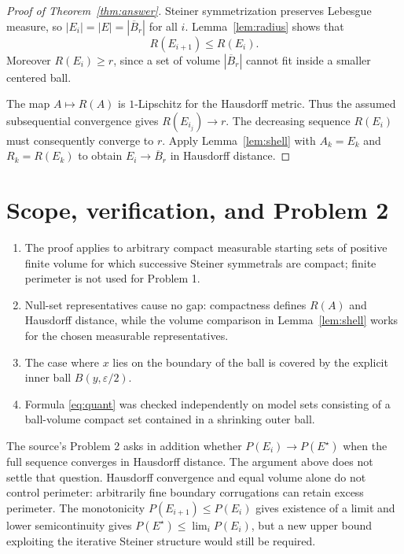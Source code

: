 \documentclass[11pt]{article}
\begin{document}
\begin{proof}[Proof of Theorem~\ref{thm:answer}]
Steiner symmetrization preserves Lebesgue measure, so
$|E_i|=|E|=|\overline B_r|$ for all $i$. Lemma~\ref{lem:radius} shows that
\[
 R(E_{i+1})\leq R(E_i).
\]
Moreover $R(E_i)\geq r$, since a set of volume $|\overline B_r|$ cannot fit
inside a smaller centered ball.

The map $A\mapsto R(A)$ is $1$-Lipschitz for the Hausdorff metric. Thus the
assumed subsequential convergence gives $R(E_{i_j})\to r$. The decreasing
sequence $R(E_i)$ must consequently converge to $r$. Apply
Lemma~\ref{lem:shell} with $A_k=E_k$ and $R_k=R(E_k)$ to obtain
$E_i\to\overline B_r$ in Hausdorff distance.
\end{proof}

\section{Scope, verification, and Problem 2}

\begin{enumerate}[leftmargin=*,itemsep=0.35em]
 \item The proof applies to arbitrary compact measurable starting sets of
 positive finite volume for which successive Steiner symmetrals are compact;
 finite perimeter is not used for Problem 1.
 \item Null-set representatives cause no gap: compactness defines $R(A)$ and
 Hausdorff distance, while the volume comparison in Lemma~\ref{lem:shell}
 works for the chosen measurable representatives.
 \item The case where $x$ lies on the boundary of the ball is covered by the
 explicit inner ball $B(y,\varepsilon/2)$.
 \item Formula \eqref{eq:quant} was checked independently on model sets
 consisting of a ball-volume compact set contained in a shrinking outer ball.
\end{enumerate}

The source's Problem 2 asks in addition whether $P(E_i)\to P(E^\star)$ when
the full sequence converges in Hausdorff distance. The argument above does not
settle that question. Hausdorff convergence and equal volume alone do not
control perimeter: arbitrarily fine boundary corrugations can retain excess
perimeter. The monotonicity $P(E_{i+1})\leq P(E_i)$ gives existence of a limit
and lower semicontinuity gives $P(E^\star)\leq\lim_iP(E_i)$, but a new upper
bound exploiting the iterative Steiner structure would still be required.
\end{document}
